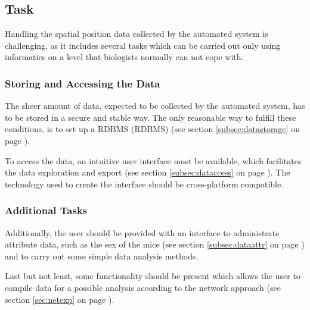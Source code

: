 \subsection{Task}
\label{subsec:task}
Handling the spatial position data collected by the automated system is challenging, as it includes several tasks which can be carried out only using informatics on a level that biologists normally can not cope with.

\subsubsection{Storing and Accessing the Data}
\label{subsubsec:storeaccess}
The sheer amount of data, expected to be collected by the automated system, has to be stored in a secure and stable way. The only reasonable way to fulfill these conditions, is to set up a \ac{RDBMS} (RDBMS) (see section \ref{subsec:datastorage} on page \pageref{subsec:datastorage}). 

To access the data, an intuitive user interface must be available, which facilitates the data exploration and export (see section \ref{subsec:dataccess} on page \pageref{subsec:dataccess}). The technology used to create the interface should be cross-platform compatible.   

\subsubsection{Additional Tasks}
\label{subsubsec:additional}
Additionally, the user should be provided with an interface to administrate attribute data, such as the sex of the mice (see section \ref{subsec:dataattr} on page \pageref{subsec:dataattr}) and to carry out some simple data analysis methods.

Last but not least, some functionality should be present which allows the user to compile data for a possible analysis according to the network approach (see section \ref{sec:netexp} on page \pageref{sec:netexp}).